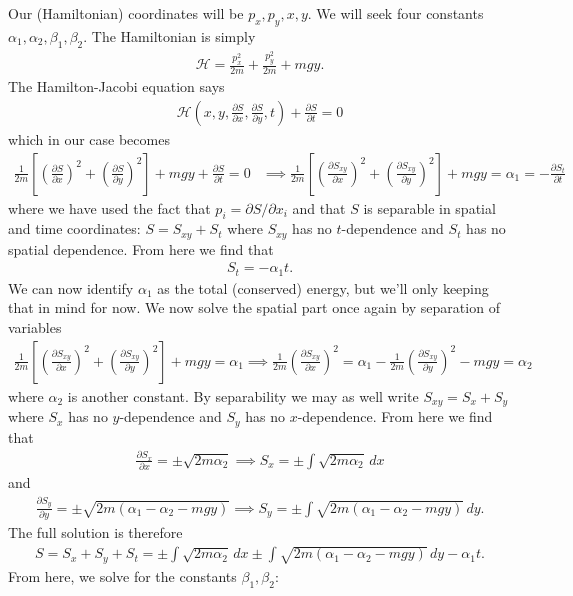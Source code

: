 \documentclass{article}
\theoremstyle{definition}
\newcommand{\p}{\partial}
\newcommand{\ham}{\mathcal{H}}
\newcommand{\al}{\alpha}
\newcommand{\be}{\beta}
\newcommand{\f}[2]{\frac{#1}{#2}}
\newcommand{\lp}{\left(}
\newcommand{\rp}{\right)}
\newcommand{\lb}{\left[}
\newcommand{\rb}{\right]}
\begin{document}
\noindent Our (Hamiltonian) coordinates will be $p_x, p_y, x,y$. We will seek four constants $\al_1,\al_2,\be_1,\be_2$. The Hamiltonian is simply 
\begin{align*}
\ham = \f{p_x^2}{2m} + \f{p_y^2}{2m} + mgy.
\end{align*}
The Hamilton-Jacobi equation says 
\begin{align*}
\ham \lp x,y, \f{\p S}{\p x}, \f{\p S}{\p y}, t \rp + \f{\p S}{\p t} = 0
\end{align*}
which in our case becomes
\begin{align*}
\f{1}{2m} \lb \lp \f{\p S}{\p x} \rp^2 + \lp\f{\p S}{\p y}\rp^2 \rb + mgy + \f{\p S}{\p t} = 0 &\implies 
\f{1}{2m} \lb \lp \f{\p S_{xy}}{\p x} \rp^2 + \lp\f{\p S_{xy}}{\p y}\rp^2 \rb + mgy  = \al_1 = -\f{\p S_t}{\p t}
\end{align*}
where we have used the fact that $p_i = \p S / \p x_i$ and that $S$ is separable in spatial and time coordinates: $S = S_{xy} + S_t$ where $S_{xy}$ has no $t$-dependence and $S_t$ has no spatial dependence. From here we find that
\begin{align*}
S_t = -\al_1 t.
\end{align*}
We can now identify $\al_1$ as the total (conserved) energy, but we'll only keeping that in mind for now. We now solve the spatial part once again by separation of variables
\begin{align*}
\f{1}{2m} \lb \lp \f{\p S_{xy}}{\p x} \rp^2 + \lp\f{\p S_{xy}}{\p y}\rp^2 \rb + mgy  = \al_1 \implies \f{1}{2m}\lp  \f{\p S_{xy}}{\p x}\rp^2  =  \al_1 - \f{1}{2m}\lp \f{\p S_{xy}}{\p y} \rp^2 -mgy = \al_2
\end{align*}
where $\al_2$ is another constant. By separability we may as well write $S_{xy} = S_x + S_y$ where $S_x$ has no $y$-dependence and $S_y$ has no $x$-dependence. From here we find that 
\begin{align*}
\f{\p S_x}{\p x} = \pm\sqrt{2m \al_2 } \implies S_x = \pm \int \sqrt{2m\al_2}\,dx
\end{align*}
and 
\begin{align*}
\f{\p S_y}{\p y} = \pm \sqrt{2m(\al_1-\al_2 - mgy)}  \implies S_y = \pm \int \sqrt{2m(\al_1-\al_2 - mgy)}\,dy.
\end{align*}
The full solution is therefore
\begin{align*}
S = S_x + S_y + S_t = \pm \int \sqrt{2m\al_2}\,dx \pm \int \sqrt{2m(\al_1-\al_2 - mgy)}\,dy -\al_1 t.
\end{align*}
From here, we solve for the constants $\be_1,\be_2$:
\end{document}
